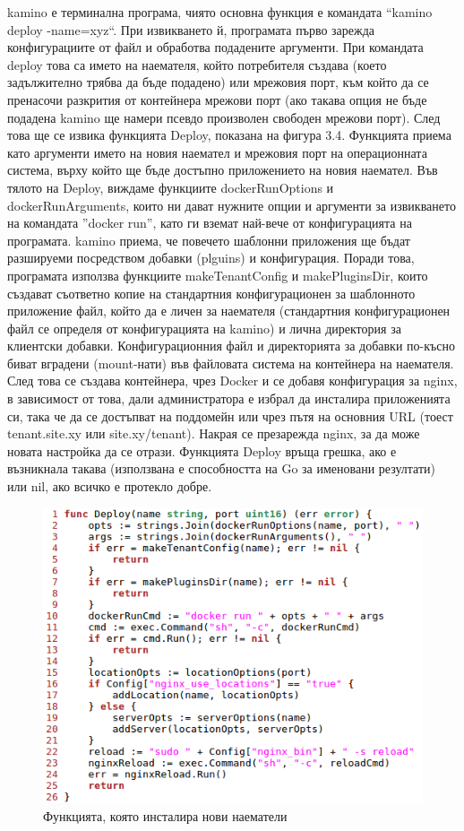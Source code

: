 \documentclass[pdftex,14pt,a4paper]{extreport}
\begin{document}
kamino е терминална програма, чиято основна функция е командата ``kamino deploy -name=xyz``. При извикването й, програмата първо зарежда конфигурациите от файл и обработва подадените аргументи. При командата deploy това са името на наемателя, който потребителя създава (което задължително трябва да бъде подадено) или мрежовия порт, към който да се пренасочи разкрития от контейнера мрежови порт (ако такава опция не бъде подадена kamino ще намери псевдо произволен свободен мрежови порт). След това ще се извика функцията Deploy, показана на фигура 3.4. Функцията приема като аргументи името на новия наемател и мрежовия порт на операционната система, върху който ще бъде достъпно приложението на новия наемател. Във тялото на Deploy, виждаме функциите dockerRunOptions и dockerRunArguments, които ни дават нужните опции и аргументи за извикването на командата ''docker run'', като ги вземат най-вече от конфигурацията на програмата. kamino приема, че повечето шаблонни приложения ще бъдат разшируеми посредством добавки (plguins) и конфигурация. Поради това, програмата използва функциите makeTenantConfig и makePluginsDir, които създават съответно копие на стандартния конфигурационен за шаблонното приложение файл, който да е личен за наемателя (стандартния конфигурационен файл се определя от конфигурацията на kamino) и лична директория за клиентски добавки. Конфигурационния файл и директорията за добавки по-късно биват вградени (mount-нати) във файловата система на контейнера на наемателя. След това се създава контейнера, чрез Docker и се добавя конфигурация за nginx, в зависимост от това, дали администратора е избрал да инсталира приложенията си, така че да се достъпват на поддомейн или чрез пътя на основния URL (тоест tenant.site.xy или site.xy/tenant). Накрая се презарежда nginx, за да може новата настройка да се отрази. Функцията Deploy връща грешка, ако е възникнала такава (използвана е способността на Go за именовани резултати) или nil, ако всичко е протекло добре.
\begin{figure}[H]
  \centering
  \includegraphics[scale=0.8]{./snippets/kamino_deploy}
  \caption{Функцията, която инсталира нови наематели}
\end{figure}
\end{document}
